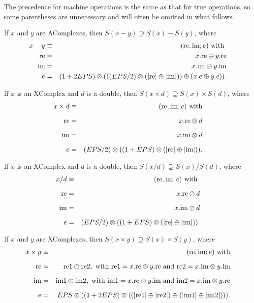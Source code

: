 The precedence for machine operations is the same as that for true operations, so some  parentheses are unnecessary
and will often be omitted in what
 follows.

If $x$ and $y$ are {\rm AComplexes,} then 
$S(x - y) \supseteq S(x) - S(y)${\rm ,} where
\begin{eqnarray*}
x-y &\equiv& ({\rm re},{\rm im};e) \hbox{ with }\\
{\rm re}& =& x.{\rm re} \ominus y.{\rm re}\\
{\rm im}& =& x.{\rm im} \ominus y.{\rm im}\\
e &=& (1 + 2 EPS) \otimes ( ((EPS/2) \otimes (|{\rm re}| \oplus |{\rm im}|))
 \oplus (x.e \oplus y.e)).
\end{eqnarray*}
\endproclaim


If $x$ is an {\rm XComplex} and $d$ is a double{\rm ,} then 
$S(x \times d) \supseteq S(x) \times S(d)${\rm ,} where
\begin{eqnarray*}
x \times d &\equiv& ({\rm re},{\rm im};e) \hbox{ with}\\[6pt] {\rm re} &= &x.{\rm re} \otimes d\\[6pt] {\rm im} &= &x.{\rm im} \otimes d\\[6pt] e &=& (EPS/2) \otimes ((1 + EPS) \otimes (|{\rm re}| \oplus |{\rm im}|) ). \end{eqnarray*}
\endproclaim

If $x$ is an {\rm XComplex} and $d$ is a double{\rm ,} then 
$S(x / d) \supseteq S(x) / S(d)${\rm ,} where
\begin{eqnarray*}
x / d& \equiv& ({\rm re},{\rm im};e) \hbox{ with }\\[6pt] {\rm re}& =& x.{\rm re} \oslash d\\[6pt] {\rm im} &= &x.{\rm im} \oslash d\\[6pt] e& = &(EPS/2) \otimes ((1 + EPS) \otimes (|{\rm re}| \oplus |{\rm im}|) ).
\end{eqnarray*}

If $x$ and $y$ are {\rm XComplexes,} then 
$S(x \times y) \supseteq S(x) \times S(y)${\rm ,} where
\begin{eqnarray*}
x \times y &\equiv& ({\rm re},{\rm im};e)\hbox{ with}\\[6pt] {\rm re}& =&{\rm  re}1 \ominus {\rm re2}, \hbox{ with ${\rm re1} = x.{\rm re} \otimes y.{\rm re}$ and ${\rm re}2 =
x.{\rm im} \otimes y.{\rm im}$} \\[6pt] {\rm im}& =& {\rm im}1 \oplus {\rm im}2, \hbox{ with ${\rm im}1 = x.{\rm re} \otimes y.{\rm im}$ and ${\rm im}2 = x.{\rm im} \otimes
y.{\rm re}$}\\[6pt] e& =& EPS \otimes ((1 + 2EPS) \otimes  ((|{\rm re}1| \oplus |{\rm re}2|) \oplus  (|{\rm im}1| \oplus |{\rm im}2|))).
\end{eqnarray*}
\endproclaim

